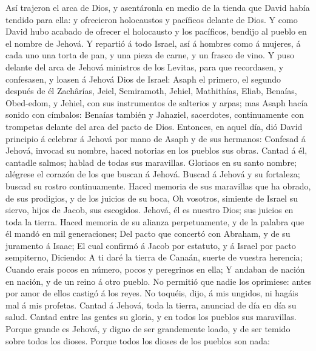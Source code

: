  Así trajeron el arca de Dios, y asentáronla en medio de la
tienda que David había tendido para ella: y ofrecieron holocaustos y
pacíficos delante de Dios.  Y como David hubo acabado de
ofrecer el holocausto y los pacíficos, bendijo al pueblo en el nombre de
Jehová.  Y repartió á todo Israel, así á hombres como á
mujeres, á cada uno una torta de pan, y una pieza de carne, y un frasco
de vino.  Y puso delante del arca de Jehová ministros de los
Levitas, para que recordasen, y confesasen, y loasen á Jehová Dios de
Israel:  Asaph el primero, el segundo después de él
Zachârías, Jeiel, Semiramoth, Jehiel, Mathithías, Eliab, Benaías,
Obed-edom, y Jehiel, con sus instrumentos de salterios y arpas; mas
Asaph hacía sonido con címbalos:  Benaías también y
Jahaziel, sacerdotes, continuamente con trompetas delante del arca del
pacto de Dios.  Entonces, en aquel día, dió David principio
á celebrar á Jehová por mano de Asaph y de sus hermanos: 
Confesad á Jehová, invocad su nombre, haced notorias en los pueblos sus
obras.  Cantad á él, cantadle salmos; hablad de todas sus
maravillas.  Gloriaos en su santo nombre; alégrese el
corazón de los que buscan á Jehová.  Buscad á Jehová y su
fortaleza; buscad su rostro continuamente.  Haced memoria
de sus maravillas que ha obrado, de sus prodigios, y de los juicios de
su boca,  Oh vosotros, simiente de Israel su siervo, hijos
de Jacob, sus escogidos.  Jehová, él es nuestro Dios; sus
juicios en toda la tierra.  Haced memoria de su alianza
perpetuamente, y de la palabra que él mandó en mil generaciones;
 Del pacto que concertó con Abraham, y de su juramento á
Isaac;  El cual confirmó á Jacob por estatuto, y á Israel
por pacto sempiterno,  Diciendo: A ti daré la tierra de
Canaán, suerte de vuestra herencia;  Cuando erais pocos en
número, pocos y peregrinos en ella;  Y andaban de nación en
nación, y de un reino á otro pueblo.  No permitió que nadie
los oprimiese: antes por amor de ellos castigó á los reyes.
 No toquéis, dijo, á mis ungidos, ni hagáis mal á mis
profetas.  Cantad á Jehová, toda la tierra, anunciad de día
en día su salud.  Cantad entre las gentes su gloria, y en
todos los pueblos sus maravillas.  Porque grande es Jehová,
y digno de ser grandemente loado, y de ser temido sobre todos los
dioses.  Porque todos los dioses de los pueblos son nada:
